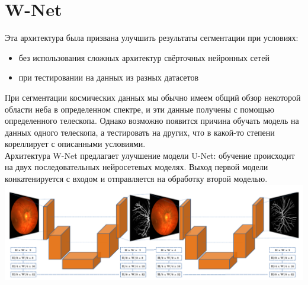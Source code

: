 \documentclass{article}
\begin{document}
\section{W-Net}
Эта архитектура была призвана улучшить результаты сегментации при условиях:\\

\begin{itemize}
    \item без использования сложных архитектур свёрточных нейронных сетей\\ 
    \item при тестировании на данных из разных датасетов\\
\end{itemize}

При сегментации космических данных мы обычно имеем общий обзор некоторой области неба в 
определенном спектре, и эти данные получены с помощью определенного телескопа. Однако возможно 
появится причина обучать модель на данных одного телескопа, а тестировать на других, что в какой-то 
степени кореллирует с описанными условиями.\\

Архитектура W-Net предлагает улучшение модели U-Net: обучение происходит на двух последовательных 
нейросетевых моделях. Выход первой модели конкатенируется с входом и отправляется на обработку второй 
моделью.\\

\includegraphics[width=\linewidth]{wnet}\\
\end{document}

